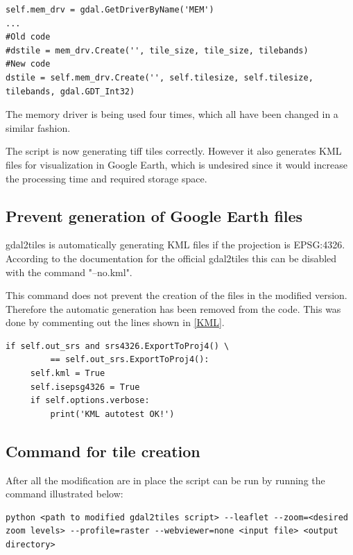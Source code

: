 \begin{lstlisting}[language=iPython, caption={Increasing the bit depth}, label= bitdepthBoost,escapechar=|]
self.mem_drv = gdal.GetDriverByName('MEM')
...
#Old code
#dstile = mem_drv.Create('', tile_size, tile_size, tilebands)
#New code
dstile = self.mem_drv.Create('', self.tilesize, self.tilesize, tilebands, gdal.GDT_Int32)
\end{lstlisting}
The memory driver is being used four times, which all have been changed in a similar fashion.


The script is now generating tiff tiles correctly. However it also generates KML files for visualization in Google Earth, which is undesired since it would increase the processing time and required storage space. 
\subsection{Prevent generation of Google Earth files}
gdal2tiles is automatically generating KML files if the projection is EPSG:4326. According to the documentation for the official gdal2tiles this can be disabled with the command "--no.kml".
\citep{gdal2tilesDoc}


This command does not prevent the creation of the files in the modified version. Therefore the automatic generation has been removed from the code. This was done by commenting out the lines shown in \ref{KML}. 

\begin{lstlisting}[language=iPython, caption={Preventing KML files from being created}, label= KML,escapechar=|]
 if self.out_srs and srs4326.ExportToProj4() \
         == self.out_srs.ExportToProj4():
     self.kml = True
     self.isepsg4326 = True
     if self.options.verbose:
         print('KML autotest OK!')
\end{lstlisting}
        
\subsection{Command for tile creation}\label{g2tCommand}

After all the modification are in place the script can be run by running the command illustrated below:

\begin{lstlisting}[language=iPython, caption={Command for creating tiles}, label= TileCommand,escapechar=|]
python <path to modified gdal2tiles script> --leaflet --zoom=<desired zoom levels> --profile=raster --webviewer=none <input file> <output directory>
\end{lstlisting}

